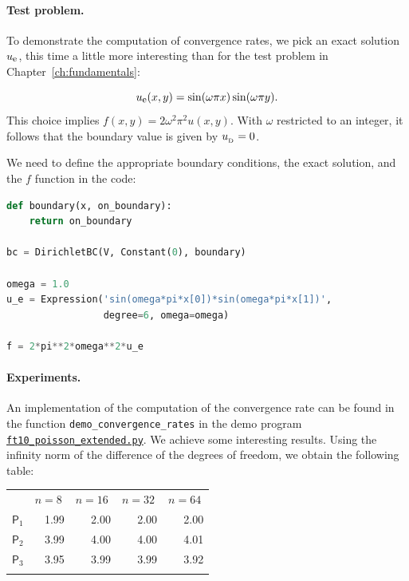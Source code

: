 \documentclass[graybox,envcountchap,sectrefs,final]{svmonodo}
\begin{document}
\paragraph{Test problem.}
To demonstrate the computation of convergence rates, we pick an
exact solution $\uex$, this time a little more interesting than
for the test problem in Chapter~\ref{ch:fundamentals}:

\begin{equation*}
\uex(x,y) = \sin(\omega\pi x)\sin(\omega\pi y).
\end{equation*}
This choice implies $f(x,y)=2\omega^2\pi^2 u(x,y)$.
With $\omega$ restricted to an integer,
it follows that the boundary value is given by $\ub=0$.

We need to define the appropriate boundary conditions, the exact
solution, and the $f$ function in the code:

\begin{lstlisting}[language=Python,style=graycolor]
def boundary(x, on_boundary):
    return on_boundary

bc = DirichletBC(V, Constant(0), boundary)

omega = 1.0
u_e = Expression('sin(omega*pi*x[0])*sin(omega*pi*x[1])',
                 degree=6, omega=omega)

f = 2*pi**2*omega**2*u_e
\end{lstlisting}

\paragraph{Experiments.}
An implementation of the computation of the convergence rate can be
found in the function \Verb!demo_convergence_rates! in the demo program
\href{{https://fenicsproject.org/pub/tutorial/python/vol1/ft10_poisson_extended.py}}{\nolinkurl{ft10_poisson_extended.py}}.
We achieve some interesting results.
Using the infinity norm of the difference of the degrees of freedom,
we obtain the following table:



{\small   %

\vspace{4mm}

\begin{tabular}{lrrrr}
\hline\noalign{\smallskip}
\multicolumn{1}{c}{ element } & \multicolumn{1}{c}{ $n=8\ $ } & \multicolumn{1}{c}{ $n=16\ $ } & \multicolumn{1}{c}{ $n=32\ $ } & \multicolumn{1}{c}{ $n=64\ $ } \\
\noalign{\smallskip}\svhline\noalign{\smallskip}
$\mathsf{P}_1$ & 1.99    & 2.00     & 2.00     & 2.00     \\
$\mathsf{P}_2$ & 3.99    & 4.00     & 4.00     & 4.01     \\
$\mathsf{P}_3$ & 3.95    & 3.99     & 3.99     & 3.92     \\
\noalign{\smallskip}\hline\noalign{\smallskip}
\end{tabular}

\vspace{4mm}

}
\end{document}
